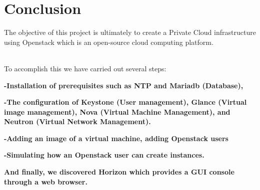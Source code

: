 \chapter*{Conclusion}
\vspace{2cm}
\par \Large The objective of this project is ultimately to create a Private Cloud infrastructure using Openstack which is an open-source cloud computing platform. \\\\
\par \Large To accomplish this we have carried out several steps: 

\begin{flushleft} \large
{
\item \textbf{-Installation of prerequisites such as NTP and Mariadb (Database),} \\[0.7cm]
\item \textbf{-The configuration of Keystone (User management), Glance (Virtual image management), Nova (Virtual Machine Management), and Neutron (Virtual Network Management).}\\[0.7cm]
\item \textbf{-Adding an image of a virtual machine, adding Openstack users }\\[0.7cm]
\item \textbf{-Simulating how an Openstack user can create instances. }\\[0.7cm]
\item \textbf{And finally, we discovered Horizon which provides
a GUI console through a web browser. }\\[0.7cm]
\item
}
\end{flushleft}


\newpage